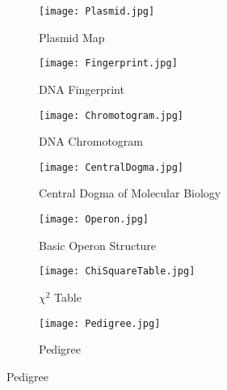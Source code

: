 \documentclass[addpoints]{exam}
\begin{document}
\begin{figure}[h!]

\begin{subfigure}{0.6\textwidth}
\centering
\texttt{[image: Plasmid.jpg]} 
\caption{Plasmid Map}
\label{fig:subim1}
\end{subfigure}
\begin{subfigure}{0.40\textwidth}
\centering
\texttt{[image: Fingerprint.jpg]}
\caption{DNA Fingerprint}
\label{fig:subim2}
\end{subfigure}
\begin{subfigure}{.5\textwidth}
\centering
\texttt{[image: Chromotogram.jpg]}
\caption{DNA Chromotogram}
\label{fig:subim3}
\end{subfigure}
\begin{subfigure}{0.5\textwidth}
\centering
\texttt{[image: CentralDogma.jpg]}
\caption{Central Dogma of Molecular Biology}
\label{fig:subim4}
\end{subfigure}
\begin{subfigure}{.5\textwidth}
\centering
\texttt{[image: Operon.jpg]}
\caption{Basic Operon Structure}

\label{fig:subim5}
\end{subfigure}
\begin{subfigure}{0.5\textwidth}
\centering
\texttt{[image: ChiSquareTable.jpg]}
\caption{$\chi^2$ Table}
\label{fig:subim6}
\end{subfigure}

\begin{subfigure}{1\textwidth}
\centering
\texttt{[image: Pedigree.jpg]}
\caption{Pedigree}
\label{fig:subim7}
\end{subfigure}



\end{figure}

\newpage
\end{document}
